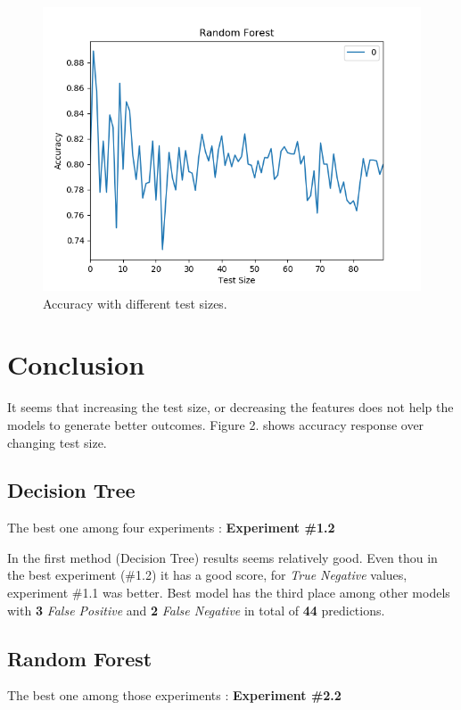 \documentclass{article}
\begin{document}
\begin{figure}
\begin{center}
	\includegraphics[scale=0.4]{rd_test_size}
  	\caption{Accuracy with different test sizes.}
  \end{center}
\end{figure}


\section{Conclusion}
It seems that increasing the test size, or decreasing the features does not help the models to generate better outcomes. Figure 2. shows accuracy response over changing test size.
\subsection{Decision Tree}
The best one among four experiments :\textbf{ Experiment \#1.2}

In the first method (Decision Tree) results seems relatively good. Even thou in the best experiment (\#1.2) it has a good score, for \textit{True Negative} values, experiment \#1.1 was better. Best model has the third place among other models with \textbf{3} \textit{False Positive} and \textbf{2} \textit{False Negative} in total of \textbf{44} predictions.

\subsection{Random Forest}
The best one among those experiments :\textbf{ Experiment \#2.2}
\end{document}
